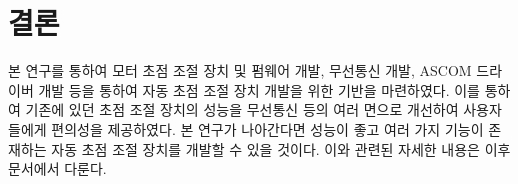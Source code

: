 \section{결론}

 본 연구를 통하여 모터 초점 조절 장치 및 펌웨어 개발, 무선통신 개발, ASCOM 드라이버 개발 등을 통하여 자동 초점 조절 장치 개발을 위한 기반을 마련하였다. 이를 통하여 기존에 있던 초점 조절 장치의 성능을 무선통신 등의 여러 면으로 개선하여 사용자들에게 편의성을 제공하였다. 본 연구가 나아간다면 성능이 좋고 여러 가지 기능이 존재하는 자동 초점 조절 장치를 개발할 수 있을 것이다. 이와 관련된 자세한 내용은 이후 문서에서 다룬다.
